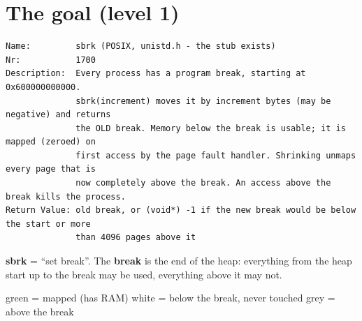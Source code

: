 \documentclass[11pt]{report}
\begin{document}
\clearpage
\section*{The goal (level 1)}

\begin{lstlisting}[language={},basicstyle=\ttfamily\footnotesize]
Name:         sbrk (POSIX, unistd.h - the stub exists)
Nr:           1700
Description:  Every process has a program break, starting at 0x600000000000.
              sbrk(increment) moves it by increment bytes (may be negative) and returns
              the OLD break. Memory below the break is usable; it is mapped (zeroed) on
              first access by the page fault handler. Shrinking unmaps every page that is
              now completely above the break. An access above the break kills the process.
Return Value: old break, or (void*) -1 if the new break would be below the start or more
              than 4096 pages above it
\end{lstlisting}

\textbf{sbrk} = ``set break''. The \textbf{break} is the end of the heap: everything from the heap
start up to the break may be used, everything above it may not.

\begin{center}

{\footnotesize green = mapped (has RAM) \quad white = below the break, never touched \quad grey = above the break}
\end{center}
\end{document}
